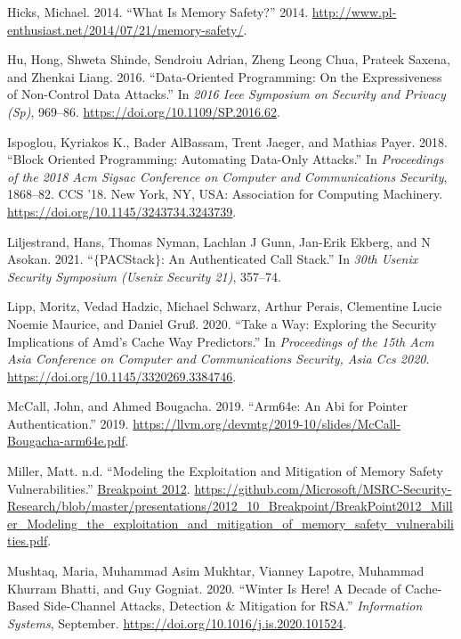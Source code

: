 \documentclass[a4paper,]{report}
\begin{document}
\leavevmode\hypertarget{ref-Hicks2014}{}%
Hicks, Michael. 2014. ``What Is Memory Safety?'' 2014.
\url{http://www.pl-enthusiast.net/2014/07/21/memory-safety/}.

\leavevmode\hypertarget{ref-Hu2016}{}%
Hu, Hong, Shweta Shinde, Sendroiu Adrian, Zheng Leong Chua, Prateek
Saxena, and Zhenkai Liang. 2016. ``Data-Oriented Programming: On the
Expressiveness of Non-Control Data Attacks.'' In \emph{2016 Ieee
Symposium on Security and Privacy (Sp)}, 969--86.
\url{https://doi.org/10.1109/SP.2016.62}.

\leavevmode\hypertarget{ref-Ispoglou2018}{}%
Ispoglou, Kyriakos K., Bader AlBassam, Trent Jaeger, and Mathias Payer.
2018. ``Block Oriented Programming: Automating Data-Only Attacks.'' In
\emph{Proceedings of the 2018 Acm Sigsac Conference on Computer and
Communications Security}, 1868--82. CCS '18. New York, NY, USA:
Association for Computing Machinery.
\url{https://doi.org/10.1145/3243734.3243739}.

\leavevmode\hypertarget{ref-Liljestrand2021}{}%
Liljestrand, Hans, Thomas Nyman, Lachlan J Gunn, Jan-Erik Ekberg, and N
Asokan. 2021. ``\(\{\)PACStack\(\}\): An Authenticated Call Stack.'' In
\emph{30th Usenix Security Symposium (Usenix Security 21)}, 357--74.

\leavevmode\hypertarget{ref-Lipp2020}{}%
Lipp, Moritz, Vedad Hadzic, Michael Schwarz, Arthur Perais, Clementine
Lucie Noemie Maurice, and Daniel Gruß. 2020. ``Take a Way: Exploring the
Security Implications of Amd's Cache Way Predictors.'' In
\emph{Proceedings of the 15th Acm Asia Conference on Computer and
Communications Security, Asia Ccs 2020}.
\url{https://doi.org/10.1145/3320269.3384746}.

\leavevmode\hypertarget{ref-McCall2019}{}%
McCall, John, and Ahmed Bougacha. 2019. ``Arm64e: An Abi for Pointer
Authentication.'' 2019.
\url{https://llvm.org/devmtg/2019-10/slides/McCall-Bougacha-arm64e.pdf}.

\leavevmode\hypertarget{ref-Miller2012}{}%
Miller, Matt. n.d. ``Modeling the Exploitation and Mitigation of Memory
Safety Vulnerabilities.''
\href{https://2012.ruxconbreakpoint.com/}{Breakpoint 2012}.
\url{https://github.com/Microsoft/MSRC-Security-Research/blob/master/presentations/2012_10_Breakpoint/BreakPoint2012_Miller_Modeling_the_exploitation_and_mitigation_of_memory_safety_vulnerabilities.pdf}.

\leavevmode\hypertarget{ref-Mushtaq2020}{}%
Mushtaq, Maria, Muhammad Asim Mukhtar, Vianney Lapotre, Muhammad Khurram
Bhatti, and Guy Gogniat. 2020. ``Winter Is Here! A Decade of Cache-Based
Side-Channel Attacks, Detection \& Mitigation for RSA.''
\emph{Information Systems}, September.
\url{https://doi.org/10.1016/j.is.2020.101524}.
\end{document}
